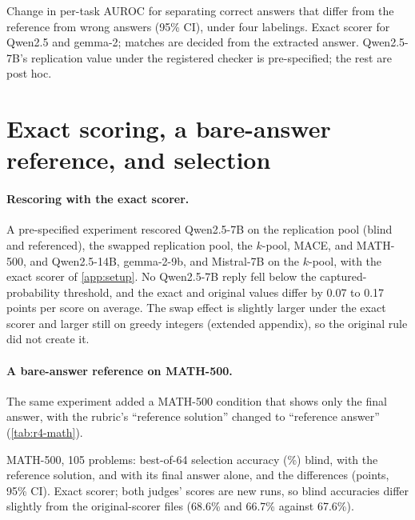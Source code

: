 \begin{table}[htbp]
\centering
\caption{Change in per-task AUROC for separating correct answers that differ from the reference from wrong answers (95\% CI), under four labelings. Exact scorer for Qwen2.5 and gemma-2; matches are decided from the extracted answer. Qwen2.5-7B's replication value under the registered checker is pre-specified; the rest are post hoc.}
\label{tab:labelings-gnm}
\footnotesize
\setlength{\tabcolsep}{3pt}
\begin{adjustbox}{max width=\linewidth}\end{adjustbox}
\end{table}

\FloatBarrier
\section{Exact scoring, a bare-answer reference, and selection}
\label{app:estimator}

\paragraph{Rescoring with the exact scorer.}
A pre-specified experiment rescored Qwen2.5-7B on the replication pool (blind and referenced), the swapped replication pool, the $k$-pool, \textsc{MACE}, and MATH-500, and Qwen2.5-14B, gemma-2-9b, and Mistral-7B on the $k$-pool, with the exact scorer of \cref{app:setup}. No Qwen2.5-7B reply fell below the captured-probability threshold, and the exact and original values differ by 0.07 to 0.17 points per score on average. The swap effect is slightly larger under the exact scorer and larger still on greedy integers (extended appendix), so the original rule did not create it.\pre
\paragraph{A bare-answer reference on MATH-500.}
The same experiment added a MATH-500 condition that shows only the final answer, with the rubric's ``reference solution'' changed to ``reference answer'' (\cref{tab:r4-math}).\pre

\begin{table}[htbp]
\centering
\caption{MATH-500, 105 problems: best-of-64 selection accuracy (\%) blind, with the reference solution, and with its final answer alone, and the differences (points, 95\% CI). Exact scorer; both judges' scores are new runs, so blind accuracies differ slightly from the original-scorer files (68.6\% and 66.7\% against 67.6\%).\pre}
\label{tab:r4-math}
\footnotesize
\setlength{\tabcolsep}{3pt}
\begin{adjustbox}{max width=\linewidth}\end{adjustbox}
\end{table}

